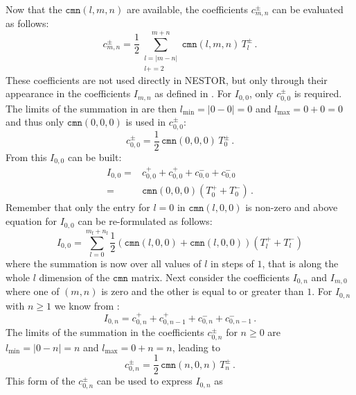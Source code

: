 \FloatBarrier
Now that the $\mathtt{cmn}(l,m,n)$ are available, the coefficients $c^{\pm}_{m,n}$ can be evaluated as follows:
\begin{equation}
   c^{\pm}_{m,n}
  = \frac{1}{2}
    \sum\limits_{\substack{l=|m-n|\\l+=2}}^{m+n}
     \mathtt{cmn}(l,m,n)\, T^{\pm}_l \, . \label{eqn:c_pm_mn_short}
\end{equation}
These coefficients are not used directly in NESTOR,
but only through their appearance in the coefficients $I_{m,n}$ as defined in .
For $I_{0,0}$, only $c^{\pm}_{0,0}$ is required.
The limits of the summation in  are then
$l_\mathrm{min} = |0-0| = 0$ and $l_\mathrm{max} = 0+0 = 0$ and thus only $\mathtt{cmn}(0,0,0)$ is used in $c^{\pm}_{0,0}$:
\begin{equation}
 c^{\pm}_{0,0} = \frac{1}{2} \,\mathtt{cmn}(0,0,0)\, T^{\pm}_0 \, .
\end{equation}
From this $I_{0,0}$ can be built:
\begin{align}
  I_{0,0} =& c^{+}_{0,0} + c^{+}_{0,0} + c^{-}_{0,0} + c^{-}_{0,0} \nonumber \\
          =& \mathtt{cmn}(0,0,0) \left( T^{+}_0 + T^{-}_0 \right) \, .
\end{align}
Remember that only the entry for $l=0$ in $\mathtt{cmn}(l,0,0)$ is non-zero
and above equation for $I_{0,0}$ can be re-formulated as follows:
\begin{equation}
  I_{0,0} = \sum_{l=0}^{m_\mathrm{f} + n_\mathrm{f}}
    \frac{1}{2} \left( \mathtt{cmn}(l,0,0) + \mathtt{cmn}(l,0,0) \right)
    \left( T^{+}_l + T^{-}_l \right) \label{eqn:I_00}
\end{equation}
where the summation is now over all values of $l$ in steps of $1$, that is along the whole $l$ dimension of the $\mathtt{cmn}$ matrix.
Next consider the coefficients $I_{0,n}$ and $I_{m,0}$ where one of $(m,n)$ is zero and the other is equal to or greater than $1$.
For $I_{0,n}$ with $n \geq 1$ we know from :
\begin{equation}
  I_{0,n} = c^{+}_{0,n} + c^{+}_{0,n-1} + c^{-}_{0,n} + c^{-}_{0,n-1} \, .
\end{equation}
The limits of the summation in the coefficients $c^{\pm}_{0,n}$ for $n\geq 0$
are $l_\mathrm{min} = |0-n| = n$ and $l_\mathrm{max} = 0+n = n$, leading to
\begin{equation}
  c^{\pm}_{0,n} = \frac{1}{2} \,\mathtt{cmn}(n,0,n)\, T^{\pm}_n \, .
\end{equation}
This form of the $c^{\pm}_{0,n}$ can be used to express $I_{0,n}$ as
